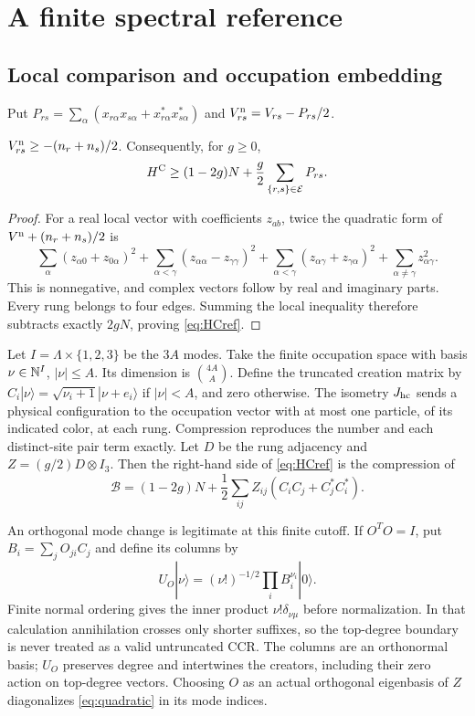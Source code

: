\section{A finite spectral reference}\label{sec:reference}
\subsection{Local comparison and occupation embedding}
Put $P_{rs}=\sum_\alpha(x_{r\alpha}x_{s\alpha}+
 x_{r\alpha}^*x_{s\alpha}^*)$ and $V^{\rm n}_{rs}=V_{rs}-P_{rs}/2$.
\begin{lemma}\label{lem:normal}
$V^{\rm n}_{rs}\ge-(n_r+n_s)/2$. Consequently, for $g\ge0$,
\begin{equation}\label{eq:HCref}
 H^{\rm C}\ge(1-2g)N+\frac g2\sum_{\{r,s\}\in\mathcal E}P_{rs}.
\end{equation}
\end{lemma}
\begin{proof}
For a real local vector with coefficients $z_{ab}$, twice the quadratic form of
$V^{\rm n}+(n_r+n_s)/2$ is
\[
 \sum_\alpha(z_{\alpha0}+z_{0\alpha})^2
 +\sum_{\alpha<\gamma}(z_{\alpha\alpha}-z_{\gamma\gamma})^2
 +\sum_{\alpha<\gamma}(z_{\alpha\gamma}+z_{\gamma\alpha})^2
 +\sum_{\alpha\ne\gamma}z_{\alpha\gamma}^2.
\]
This is nonnegative, and complex vectors follow by real and imaginary parts.
Every rung belongs to four edges. Summing the local inequality therefore
subtracts exactly $2gN$, proving \eqref{eq:HCref}.
\end{proof}

Let $I=\Lambda\times\{1,2,3\}$ be the $3A$ modes. Take the finite occupation
space with basis $\nu\in\mathbb N^I$, $|\nu|\le A$. Its dimension is
$\binom{4A}{A}$. Define the truncated creation matrix by
$C_i|\nu\rangle=\sqrt{\nu_i+1}|\nu+e_i\rangle$ if $|\nu|<A$, and zero otherwise.
The isometry $J_{\rm hc}$ sends a physical configuration to the occupation
vector with at most one particle, of its indicated color, at each rung.
Compression reproduces the number and each distinct-site pair term exactly.
Let $D$ be the rung adjacency and $Z=(g/2)D\otimes I_3$. Then the right-hand
side of \eqref{eq:HCref} is the compression of
\begin{equation}\label{eq:quadratic}
 \mathcal B=(1-2g)N+\frac12\sum_{ij}Z_{ij}(C_iC_j+C_j^*C_i^*).
\end{equation}

An orthogonal mode change is legitimate at this finite cutoff. If $O^TO=I$,
put $B_i=\sum_jO_{ji}C_j$ and define its columns by
\[
 U_O|\nu\rangle=(\nu!)^{-1/2}\prod_iB_i^{\nu_i}|0\rangle.
\]
Finite normal ordering gives the inner product $\nu!\delta_{\nu\mu}$ before
normalization. In that calculation annihilation crosses only shorter suffixes,
so the top-degree boundary is never treated as a valid untruncated CCR.
The columns are an orthonormal basis; $U_O$ preserves degree and intertwines the
creators, including their zero action on top-degree vectors. Choosing $O$ as
an actual orthogonal eigenbasis of $Z$ diagonalizes \eqref{eq:quadratic} in its
mode indices.

